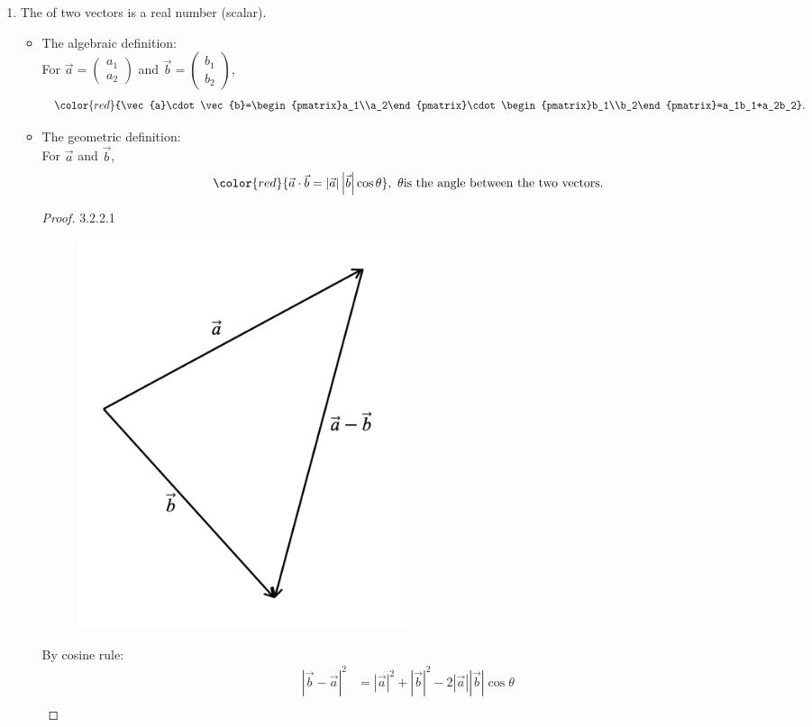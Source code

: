 \documentclass[12pt, a4paper]{article}
\begin{document}
\begin{enumerate}
  \item The \textbf{\color{red}{scalar product}} of two vectors is a real number (scalar). 
  \begin{itemize}
    \item The algebraic definition: \\
    For $\vec{a}=\begin{pmatrix}a_1\\a_2\end{pmatrix}$ and $\vec{b}=\begin{pmatrix}b_1\\b_2\end{pmatrix}$,
    $${\color{red}{\vec{a}\cdot\vec{b}=\begin{pmatrix}a_1\\a_2\end{pmatrix}\cdot\begin{pmatrix}b_1\\b_2\end{pmatrix}=a_1b_1+a_2b_2}}.$$
    {\color{green}{The scalar product is also called the dot product. }}
    \item The geometric definition: \\
    For $\vec{a}$ and $\vec{b}$,
    $${\color{red}{\vec{a}\cdot\vec{b}=\left|\vec{a}\right|\left|\vec{b}\right|\cos\theta}},\ \theta{\text{is the angle between the two vectors.}}$$
    \begin{proof}{3.2.2.1}{}
      \begin{figure}[H]
        \centering
        \includegraphics[width=0.5\textwidth]{Fig.3.7.jpg}
      \end{figure}
      By cosine rule: 
      $$\begin{aligned}
        \left|\vec{b}-\vec{a}\right|^2&=\left|\vec{a}\right|^2+\left|\vec{b}\right|^2-2\left|\vec{a}\right|\left|\vec{b}\right|\cos\theta\\

\end{aligned}$$
\end{proof}
\end{itemize}
\end{enumerate}
\end{document}
